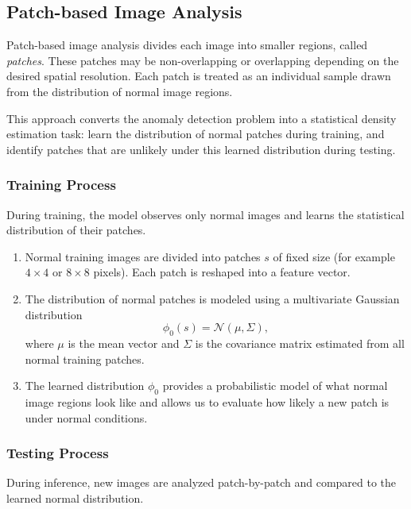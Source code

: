 \documentclass{article}
\begin{document}
\subsection{Patch-based Image Analysis}

Patch-based image analysis divides each image into smaller regions, called
\emph{patches}. These patches may be non-overlapping or overlapping depending on
the desired spatial resolution. Each patch is treated as an individual sample
drawn from the distribution of normal image regions.

This approach converts the anomaly detection problem into a statistical density
estimation task: learn the distribution of normal patches during training, and
identify patches that are unlikely under this learned distribution during
testing.

\subsubsection{Training Process}

During training, the model observes only normal images and learns the
statistical distribution of their patches.

\begin{enumerate}
    \item Normal training images are divided into patches $s$ of fixed size
    (for example $4\times4$ or $8\times8$ pixels). Each patch is reshaped into a
    feature vector.
    
    \item The distribution of normal patches is modeled using a multivariate
    Gaussian distribution
    \[
        \phi_0(s) = \mathcal{N}(\mu,\Sigma),
    \]
    where $\mu$ is the mean vector and $\Sigma$ is the covariance matrix
    estimated from all normal training patches.
    
    \item The learned distribution $\phi_0$ provides a probabilistic model of
    what normal image regions look like and allows us to evaluate how likely a
    new patch is under normal conditions.
\end{enumerate}

\subsubsection{Testing Process}

During inference, new images are analyzed patch-by-patch and compared to the
learned normal distribution.
\end{document}

